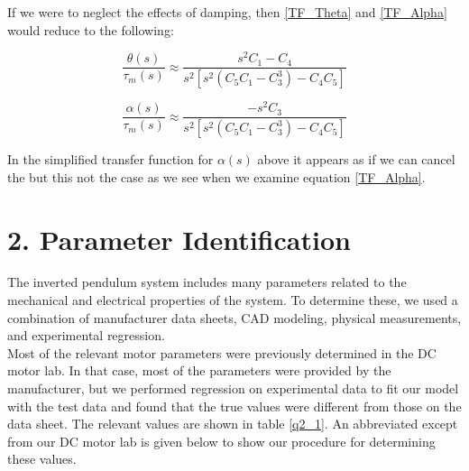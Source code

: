 \documentclass{article}
\theoremstyle{plain}
\theoremstyle{definition}
\theoremstyle{remark}
\begin{document}
If we were to neglect the effects of damping, then \eqref{TF_Theta} and \eqref{TF_Alpha} would reduce to the following:

$$ \frac{\theta(s)}{\tau_{m}(s)} \approx \frac{s^2 C_1 - C_4}{s^2 \left[s^2 \left(C_5 C_1 - C_3^3 \right) - C_4 C_5\right]} $$

$$ \frac{\alpha(s)}{\tau_{m}(s)} \approx \frac{- s^2 C_3}{s^2 \left[s^2 \left(C_5 C_1 - C_3^3 \right) - C_4 C_5\right]} $$

In the simplified transfer function for $\alpha (s)$ above it appears as if we can cancel the but this not the case as we see when we examine equation \eqref{TF_Alpha}.  

\section*{2. Parameter Identification}
The inverted pendulum system includes many parameters related to the mechanical and electrical properties of the system. To determine these, we used a combination of manufacturer data sheets, CAD modeling, physical measurements, and experimental regression.\\

Most of the relevant motor parameters were previously determined in the DC motor lab. In that case, most of the parameters were provided by the manufacturer, but we performed regression on experimental data to fit our model with the test data and found that the true values were different from those on the data sheet. The relevant values are shown in table \ref{q2_1}. An abbreviated except from our DC motor lab is given below to show our procedure for determining these values. \\
\end{document}
